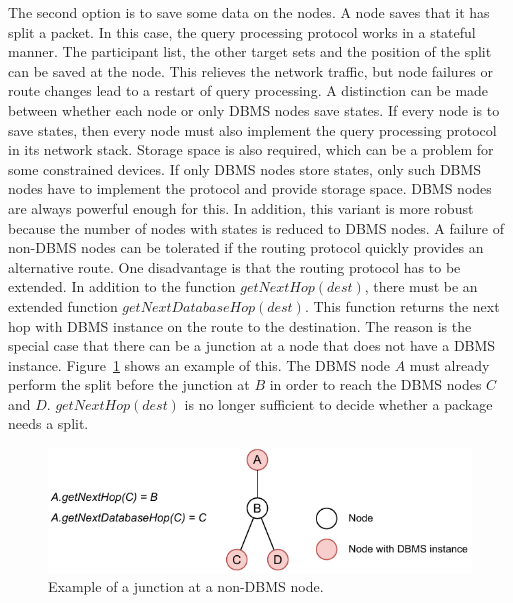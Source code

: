 \documentclass[english,version-2019-11]{uzl-thesis}
\begin{document}
The second option is to save some data on the nodes.
A node saves that it has split a packet. In this case, the query processing protocol works in a stateful manner. The participant list, the other target sets and the position of the split can be saved at the node. This relieves the network traffic, but node failures or route changes lead to a restart of query processing. A distinction can be made between whether each node or only DBMS nodes save states. If every node is to save states, then every node must also implement the query processing protocol in its network stack. Storage space is also required, which can be a problem for some constrained devices. If only DBMS nodes store states, only such DBMS nodes have to implement the protocol and provide storage space. DBMS nodes are always powerful enough for this. In addition, this variant is more robust because the number of nodes with states is reduced to DBMS nodes. A failure of non-DBMS nodes can be tolerated if the routing protocol quickly provides an alternative route. One disadvantage is that the routing protocol has to be extended. In addition to the function $getNextHop(dest)$, there must be an extended function $getNextDatabaseHop(dest)$. This function returns the next hop with DBMS instance on the route to the destination. The reason is the special case that there can be a junction at a node that does not have a DBMS instance. Figure~\ref{figure_nextDBHopFunc} shows an example of this. The DBMS node $A$ must already perform the split before the junction at $B$ in order to reach the DBMS nodes $C$ and $D$. $getNextHop(dest)$ is no longer sufficient to decide whether a package needs a split.
\begin{figure}[htpb]
  \centering
  \includegraphics[scale=1.1]{figure_nextDBHopFunc.pdf}
  \caption{Example of a junction at a non-DBMS node.}
  \label{figure_nextDBHopFunc}
\end{figure}
\end{document}
